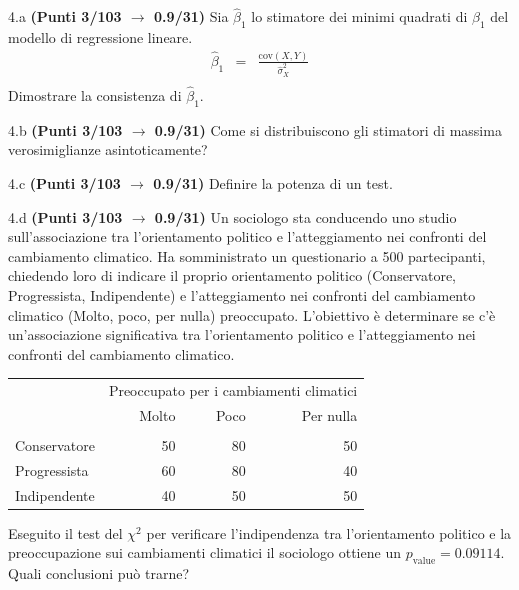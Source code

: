 \documentclass[
  11pt,
]{book}
\theoremstyle{mytheoremstyle}
\theoremstyle{mydefstyle}
\begin{document}
4.a \textbf{(Punti 3/103 \(\rightarrow\) 0.9/31)} Sia \(\hat \beta_1\) lo stimatore dei minimi quadrati di \(\beta_1\) del modello di regressione lineare.
\begin{eqnarray*}
  \hat\beta_1 &=&  \frac{\text{cov}(X,Y)}{\hat\sigma_X^2}\\
\end{eqnarray*}
Dimostrare la consistenza di \(\hat\beta_1\).

4.b \textbf{(Punti 3/103 \(\rightarrow\) 0.9/31)} Come si distribuiscono gli stimatori di massima verosimiglianze asintoticamente?

4.c \textbf{(Punti 3/103 \(\rightarrow\) 0.9/31)} Definire la potenza di un test.

4.d \textbf{(Punti 3/103 \(\rightarrow\) 0.9/31)} Un sociologo sta conducendo uno studio sull'associazione tra l'orientamento politico e l'atteggiamento nei confronti del cambiamento climatico. Ha somministrato un questionario a 500 partecipanti, chiedendo loro di indicare il proprio orientamento politico (Conservatore, Progressista, Indipendente) e l'atteggiamento nei confronti del cambiamento climatico (Molto, poco, per nulla) preoccupato. L'obiettivo è determinare se c'è un'associazione significativa tra l'orientamento politico e l'atteggiamento nei confronti del cambiamento climatico.

\begin{table}[H]
\centering\centering\centering
\begin{tabular}{lrrr}
\toprule
\multicolumn{1}{c}{ } & \multicolumn{3}{c}{Preoccupato per i cambiamenti climatici} \\
\cmidrule(l{3pt}r{3pt}){2-4}
  & Molto & Poco & Per nulla\\
\midrule
\addlinespace[0.3em]
\multicolumn{4}{l}{\textbf{Orientamento politico}}\\
\hspace{1em}Conservatore & 50 & 80 & 50\\
\hspace{1em}Progressista & 60 & 80 & 40\\
\hspace{1em}Indipendente & 40 & 50 & 50\\
\bottomrule
\end{tabular}
\end{table}

Eseguito il test del \(\chi^2\) per verificare l'indipendenza tra l'orientamento politico e la preoccupazione
sui cambiamenti climatici il sociologo ottiene un \(p_\text{value}=0.09114\). Quali conclusioni può trarne?
\end{document}
